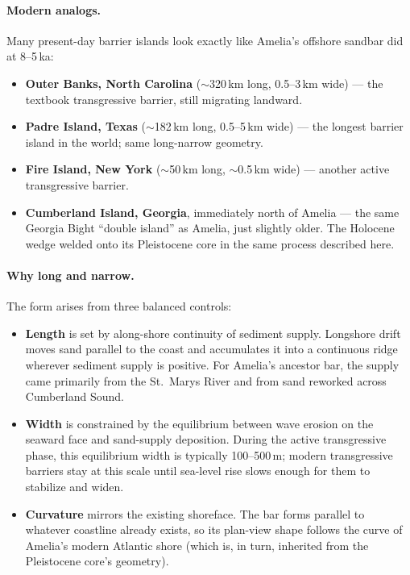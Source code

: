 \documentclass[11pt]{article}
\begin{document}
\paragraph{Modern analogs.}
Many present-day barrier islands look exactly like Amelia's offshore
sandbar did at 8--5\,ka:

\begin{itemize}[leftmargin=2em]
\item \textbf{Outer Banks, North Carolina} ($\sim$320\,km long, 0.5--3\,km
wide) --- the textbook transgressive barrier, still migrating landward.
\item \textbf{Padre Island, Texas} ($\sim$182\,km long, 0.5--5\,km wide)
--- the longest barrier island in the world; same long-narrow geometry.
\item \textbf{Fire Island, New York} ($\sim$50\,km long, $\sim$0.5\,km
wide) --- another active transgressive barrier.
\item \textbf{Cumberland Island, Georgia}, immediately north of Amelia
--- the same Georgia Bight ``double island'' as Amelia, just slightly
older. The Holocene wedge welded onto its Pleistocene core in the same
process described here.
\end{itemize}

\paragraph{Why long and narrow.}
The form arises from three balanced controls:

\begin{itemize}[leftmargin=2em]
\item \textbf{Length} is set by along-shore continuity of sediment supply.
Longshore drift moves sand parallel to the coast and accumulates it into
a continuous ridge wherever sediment supply is positive. For Amelia's
ancestor bar, the supply came primarily from the St.\ Marys River and from
sand reworked across Cumberland Sound.
\item \textbf{Width} is constrained by the equilibrium between wave erosion
on the seaward face and sand-supply deposition. During the active
transgressive phase, this equilibrium width is typically 100--500\,m;
modern transgressive barriers stay at this scale until sea-level rise
slows enough for them to stabilize and widen.
\item \textbf{Curvature} mirrors the existing shoreface. The bar forms
parallel to whatever coastline already exists, so its plan-view shape
follows the curve of Amelia's modern Atlantic shore (which is, in turn,
inherited from the Pleistocene core's geometry).
\end{itemize}
\end{document}
